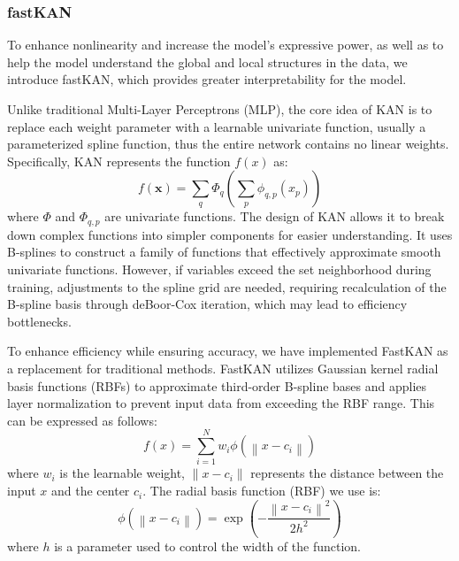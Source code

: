 \documentclass[lettersize,journal]{IEEEtran}
\begin{document}
\subsubsection{\textbf{fastKAN}}
To enhance nonlinearity and increase the model's expressive power, as well as to help the model understand the global and local structures in the data, we introduce fastKAN\cite{li2024kolmogorovarnoldnetworksradialbasis}, which provides greater interpretability for the model.

Unlike traditional Multi-Layer Perceptrons (MLP)\cite{taud2018multilayer}, the core idea of KAN\cite{liu2024kankolmogorovarnoldnetworks} is to replace each weight parameter with a learnable univariate function, usually a parameterized spline function, thus the entire network contains no linear weights. Specifically, KAN represents the function \( f(x) \) as:
\begin{equation}
	f(\mathbf{x}) = \sum_q \Phi_q \left( \sum_p \phi_{q,p}(x_p) \right)
\end{equation} 
where \( \Phi \) and \( \Phi_{q,p} \) are univariate functions.
The design of KAN allows it to break down complex functions into simpler components for easier understanding. It uses B-splines to construct a family of functions that effectively approximate smooth univariate functions. However, if variables exceed the set neighborhood during training, adjustments to the spline grid are needed, requiring recalculation of the B-spline\cite{de1972calculating} basis through deBoor-Cox iteration, which may lead to efficiency bottlenecks.

To enhance efficiency while ensuring accuracy, we have implemented FastKAN as a replacement for traditional methods. FastKAN utilizes Gaussian kernel radial basis functions (RBFs)\cite{buhmann2000radial} to approximate third-order B-spline bases and applies layer normalization to prevent input data from exceeding the RBF range.
This can be expressed as follows:
\begin{equation}
	f(x) = \sum_{i=1}^{N} w_{i} \phi\left( \left\| x - c_{i} \right\| \right)
\end{equation}
where \( w_i \) is the learnable weight, \(\| x - c_i \|\) represents the distance between the input \(x\) and the center \(c_i\). The radial basis function (RBF) we use is:
\begin{equation}
	\phi( \left\| x - c_{i} \right\|) = \exp\left(-\frac{ \left\| x - c_{i} \right\|^2}{2h^2}\right)
\end{equation}
where \(h\) is a parameter used to control the width of the function.
\end{document}
